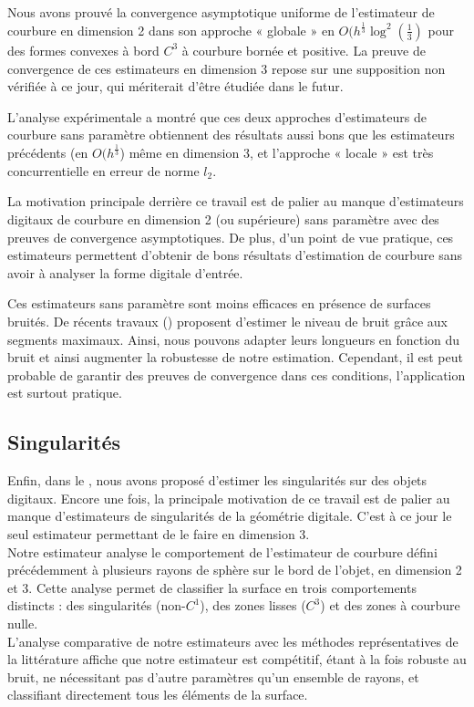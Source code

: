 Nous avons prouvé la convergence asymptotique uniforme de l'estimateur de
courbure en dimension 2 dans son approche « globale » en $O(h^\frac{1}{3} \log^2
\left(\frac{1}{3}\right)$ pour des formes convexes à bord $C^3$ à courbure
bornée et positive. La preuve de convergence de ces estimateurs en dimension 3
repose sur une supposition non vérifiée à ce jour, qui mériterait d'être étudiée
dans le futur.

L'analyse expérimentale a montré que ces deux approches d'estimateurs de
courbure sans paramètre obtiennent des résultats aussi bons que les estimateurs
précédents (en $O(h^\frac{1}{3}$) même en dimension 3, et l'approche « locale »
est très concurrentielle en erreur de norme $l_2$.

La motivation principale derrière ce travail est de palier au manque
d'estimateurs digitaux de courbure en dimension 2 (ou supérieure) sans paramètre
avec des preuves de convergence asymptotiques. De plus, d'un point de vue
pratique, ces estimateurs permettent d'obtenir de bons résultats d'estimation de
courbure sans avoir à analyser la forme digitale d'entrée.

Ces estimateurs sans paramètre sont moins efficaces en présence de surfaces
bruités. De récents travaux () proposent
d'estimer le niveau de bruit grâce aux segments maximaux. Ainsi, nous pouvons
adapter leurs longueurs en fonction du bruit et ainsi augmenter la robustesse de
notre estimation. Cependant, il est peut probable de garantir des preuves de
convergence dans ces conditions, l'application est surtout pratique.
%
\subsection*{Singularités}
%
Enfin, dans le , nous avons proposé d'estimer les
singularités sur des objets digitaux. Encore une fois, la principale motivation
de ce travail est de palier au manque d'estimateurs de singularités de la
géométrie digitale. C'est à ce jour le seul estimateur permettant de le faire en
dimension 3.
%
\\
%
Notre estimateur analyse le comportement de l'estimateur de courbure défini
précédemment à plusieurs rayons de sphère sur le bord de l'objet, en dimension 2
et 3. Cette analyse permet de classifier la surface en trois comportements
distincts : des singularités (non-$C^1$), des zones lisses ($C^3$) et des zones à
courbure nulle.
%
\\
%
L'analyse comparative de notre estimateurs avec les méthodes représentatives de
la littérature affiche que notre estimateur est compétitif, étant à la fois
robuste au bruit, ne nécessitant pas d'autre paramètres qu'un ensemble de
rayons, et classifiant directement tous les éléments de la surface.


